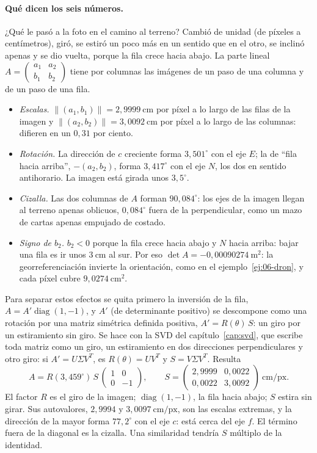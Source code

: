 \paragraph{Qué dicen los seis números.} ¿Qué le pasó a la foto en el camino al terreno? Cambió
de unidad (de píxeles a centímetros), giró, se estiró un poco más en un sentido que en el otro,
se inclinó apenas y se dio vuelta, porque la fila crece hacia abajo. La parte lineal
\(A=\left(\begin{smallmatrix}a_1&a_2\\b_1&b_2\end{smallmatrix}\right)\) tiene por columnas las
imágenes de un paso de una columna y de un paso de una fila.
\begin{itemize}
\item \emph{Escalas.} \(\lVert(a_1,b_1)\rVert=2{,}9999\ \mathrm{cm}\) por píxel a lo largo de
las filas de la imagen y \(\lVert(a_2,b_2)\rVert=3{,}0092\ \mathrm{cm}\) por píxel a lo largo de
las columnas: difieren en un \(0{,}31\) por ciento.
\item \emph{Rotación.} La dirección de \(c\) creciente forma \(3{,}501^\circ\) con el eje \(E\);
la de \enquote{fila hacia arriba}, \(-(a_2,b_2)\), forma \(3{,}417^\circ\) con el eje \(N\), los dos en
sentido antihorario. La imagen está girada unos \(3{,}5^\circ\).
\item \emph{Cizalla.} Las dos columnas de \(A\) forman \(90{,}084^\circ\): los ejes de la imagen
llegan al terreno apenas oblicuos, \(0{,}084^\circ\) fuera de la perpendicular, como un mazo de
cartas apenas empujado de costado.
\item \emph{Signo de \(b_2\).} \(b_2<0\) porque la fila crece hacia abajo y \(N\) hacia arriba:
bajar una fila es ir unos \(3\ \mathrm{cm}\) al sur. Por eso
\(\det A=-0{,}00090274\ \mathrm{m}^2\): la georreferenciación invierte la orientación, como en el
ejemplo~\ref{ej:06-dron}, y cada píxel cubre \(9{,}0274\ \mathrm{cm}^2\).
\end{itemize}
Para separar estos efectos se quita primero la inversión de la fila,
\(A=A'\operatorname{diag}(1,-1)\), y \(A'\) (de determinante positivo) se descompone como una
rotación por una matriz simétrica definida positiva, \(A'=R(\theta)\,S\): un giro por un
estiramiento sin giro. Se hace con la SVD del capítulo~\ref{cap:svd}, que escribe toda matriz
como un giro, un estiramiento en dos direcciones perpendiculares y otro giro: si \(A'=U\Sigma V^T\), es \(R(\theta)=UV^T\) y \(S=V\Sigma V^T\). Resulta
\[
  A=R(3{,}459^\circ)\,S\,\begin{pmatrix}1&0\\0&-1\end{pmatrix},
  \qquad
  S=\begin{pmatrix}2{,}9999&0{,}0022\\0{,}0022&3{,}0092\end{pmatrix}\ \mathrm{cm/px}.
\]
El factor \(R\) es el giro de la imagen; \(\operatorname{diag}(1,-1)\), la fila hacia abajo;
\(S\) estira sin girar. Sus autovalores, \(2{,}9994\) y \(3{,}0097\ \mathrm{cm/px}\), son las
escalas extremas, y la dirección de la mayor forma \(77{,}2^\circ\) con el eje \(c\): está
cerca del eje \(f\). El término fuera de la diagonal es la cizalla. Una similaridad
tendría \(S\) múltiplo de la identidad.


